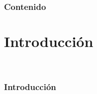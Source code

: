\documentclass{beamer}
\begin{document}
\begin{frame}
  \frametitle{Contenido}
 \setcounter{tocdepth}{1} %
  \tableofcontents
\end{frame}

\section{Introducción}
\begin{frame}
\begin{center}
\Huge{\color{blue}{Introducción}} \\
\end{center}
\end{frame}

\begin{frame}
\frametitle{Introducción}
\end{frame}
\end{document}
